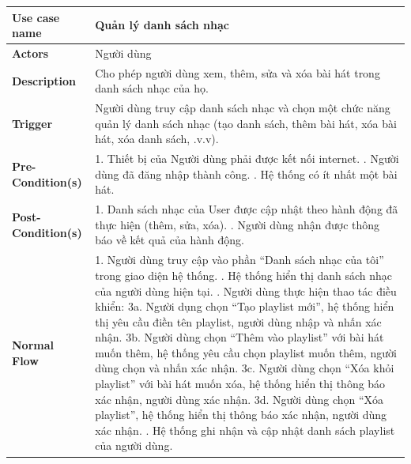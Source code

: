 \documentclass[a4paper]{article}
\newcommand{\cach}{\hspace*{1.5em}\ignorespaces}
\begin{document}
\begin{table}[h!]
\centering
\renewcommand{\arraystretch}{1.3} %
\begin{tabularx}{\textwidth}{|l|X|}
\hline
\textbf{Use case name} & Quản lý danh sách nhạc \\ \hline
\textbf{Actors}        & Người dùng \\ \hline
\textbf{Description}   & Cho phép người dùng xem, thêm, sửa và xóa bài hát trong danh sách nhạc của họ. \\ \hline
\textbf{Trigger}       & Người dùng truy cập danh sách nhạc và chọn một chức năng quản lý danh sách nhạc (tạo danh sách, thêm bài hát, xóa bài hát, xóa danh sách, .v.v). \\ \hline
\textbf{Pre-Condition(s)} 
& 1. Thiết bị của Người dùng phải được kết nối internet. \newline
  2. Người dùng đã đăng nhập thành công. \newline
  3. Hệ thống có ít nhất một bài hát. \\ \hline
\textbf{Post-Condition(s)} 
& 1. Danh sách nhạc của User được cập nhật theo hành động đã thực hiện (thêm, sửa, xóa). \newline
  2. Người dùng nhận được thông báo về kết quả của hành động. \\ \hline
\textbf{Normal Flow}   
& 1. Người dùng truy cập vào phần “Danh sách nhạc của tôi” trong giao diện hệ thống. \newline
  2. Hệ thống hiển thị danh sách nhạc của người dùng hiện tại. \newline
  3. Người dùng thực hiện thao tác điều khiển: \newline
  \cach 3a. Người dụng chọn ``Tạo playlist mới'', hệ thống hiển thị yêu cầu điền tên playlist, người dùng nhập và nhấn xác nhận. \newline
  \cach 3b. Người dùng chọn ``Thêm vào playlist'' với bài hát muốn thêm, hệ thống yêu cầu chọn playlist muốn thêm, người dùng chọn và nhấn xác nhận. \newline
  \cach 3c. Người dùng chọn ``Xóa khỏi playlist'' với bài hát muốn xóa, hệ thống hiển thị thông báo xác nhận, người dùng xác nhận. \newline
  \cach 3d. Người dùng chọn ``Xóa playlist'', hệ thống hiển thị thông báo xác nhận, người dùng xác nhận. \newline
  4. Hệ thống ghi nhận và cập nhật danh sách playlist của người dùng. \\ \hline

\end{tabularx}
\end{table}
\end{document}
